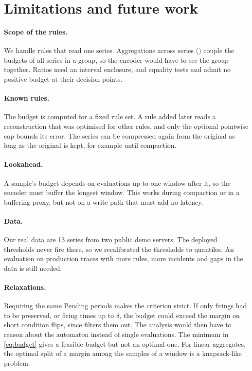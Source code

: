 \section{Limitations and future work}
\label{sec:conclusion}

\paragraph{Scope of the rules.} We handle rules that read one series.
Aggregations across series () couple the budgets of all
series in a group, so the encoder would have to see the group together.
Ratios need an interval enclosure, and equality tests and 
admit no positive budget at their decision points.

\paragraph{Known rules.} The budget is computed for a fixed rule set. A
rule added later reads a reconstruction that was optimised for other
rules, and only the optional pointwise cap bounds its error. The series
can be compressed again from the original as long as the original is kept,
for example until compaction.

\paragraph{Lookahead.} A sample's budget depends on evaluations up to one
window after it, so the encoder must buffer the longest window. This works
during compaction or in a buffering proxy, but not on a write path that
must add no latency.

\paragraph{Data.} Our real data are 13 series from two public demo
servers. The deployed thresholds never fire there, so we recalibrated the
thresholds to quantiles. An evaluation on production traces with more
rules, more incidents and gaps in the data is still needed.

\paragraph{Relaxations.} Requiring the same \textsf{Pending} periods makes
the criterion strict. If only firings had to be preserved, or firing times
up to $\delta$, the budget could exceed the margin on short condition
flips, since  filters them out. The analysis would then have to
reason about the automaton instead of single evaluations. The minimum in
\eqref{eq:budget} gives a feasible budget but not an optimal one. For
linear aggregates, the optimal split of a margin among the samples of a
window is a knapsack-like problem.

